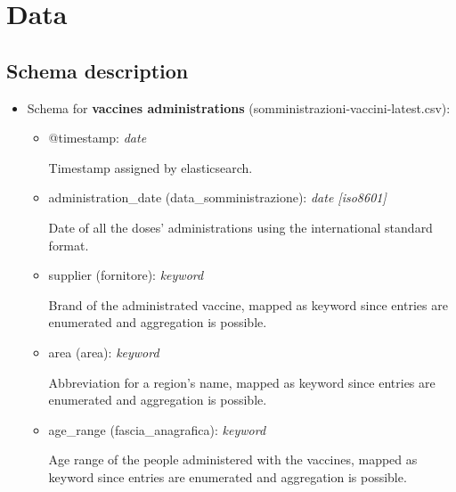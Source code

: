 \documentclass[12pt, a4paper]{article}
\begin{document}
\section{Data }

\subsection{Schema description}

\begin{itemize}
  \item Schema for \textbf{vaccines administrations} 
    (somministrazioni-vaccini-latest.csv):
    \begin{itemize}
      \item @timestamp: \emph{date} \\
        \begin{footnotesize}
          Timestamp assigned by elasticsearch.
        \end{footnotesize}
      \item administration\_date (data\_somministrazione): \emph{date [iso8601]} \\
        \begin{footnotesize}
          Date of all the doses' administrations using the international standard format.
        \end{footnotesize}
      \item supplier (fornitore): \emph{keyword} \\
        \begin{footnotesize}
          Brand of the administrated vaccine, mapped as keyword since entries are 
          enumerated and aggregation is possible.
        \end{footnotesize}
      \item area (area): \emph{keyword} \\
        \begin{footnotesize}
          Abbreviation for a region's name, mapped as keyword since entries are 
          enumerated and aggregation is possible.
        \end{footnotesize}
      \item age\_range (fascia\_anagrafica): \emph{keyword} \\
        \begin{footnotesize}
          Age range of the people administered with the vaccines, mapped as keyword since
          entries are enumerated and aggregation is possible.
        \end{footnotesize}

\end{itemize}
\end{itemize}
\end{document}
